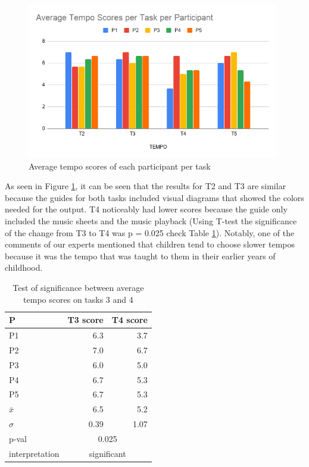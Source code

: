 \begin{figure}[H]
    \centering
    \includegraphics[width=11cm]{figures/Results/AverageTempo.png}
    \caption{Average tempo scores of each participant per task}
    \label{fig:AverageTempo}
\end{figure}

As seen in Figure \ref{fig:AverageTempo}, it can be seen that the results for T2 and T3 are similar because the guides for both tasks included visual diagrams that showed the colors needed for the output. T4 noticeably had lower scores because the guide only included the music sheets and the music playback (Using T-test the significance of the change from T3 to T4 was p = 0.025 check Table \ref{table:T3vT4tempo}). Notably, one of the comments of our experts mentioned that children tend to choose slower tempos because it was the tempo that was taught to them in their earlier years of childhood.

\begin{table}[H]
\caption{Test of significance between average tempo scores on tasks 3 and 4}
\label{table:T3vT4tempo}
\centering
\begin{tabular}{lrr}
\hline \hline
  P   & T3 score          & T4 score          \\ \hline
P1             & 6.3                                    & 3.7                                    \\ \hline
P2             & 7.0                                    & 6.7                                    \\ \hline
P3             & 6.0                                    & 5.0                                    \\ \hline
P4             & 6.7                                    & 5.3                                    \\ \hline
P5             & 6.7                                    & 5.3                                    \\ \hline
$\bar{x}$             & 6.5 & 5.2                                                        \\ \hline
$\sigma$              & 0.39                                   & 1.07                                   \\ \hline
p-val          & \multicolumn{2}{c}{0.025}                                                      \\ \hline
interpretation & \multicolumn{2}{c}{significant} \\ \hline \hline
\end{tabular}
\end{table}

